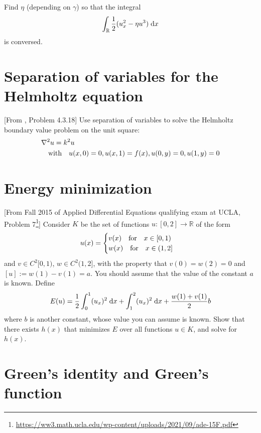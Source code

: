 \documentclass[11pt,letterpaper]{article}
\begin{document}
\subsection{}
Find $\eta$ (depending on $\gamma$) so that the integral
\begin{align}
    \int_\mathbb{R} \frac{1}{2}(u_x^2-\eta u^3)\;\mathrm{d} x
\end{align}
is conversed. 

\section{Separation of variables for the Helmholtz equation}
[From \cite{Olver_14}, Problem 4.3.18] Use separation of variables to solve the Helmholtz boundary value problem on the unit square:
\begin{align}
    &\nabla^2 u = k^2u\\
    &\quad \mbox{with} \quad u(x,0)=0, u(x,1)=f(x), u(0, y) = 0, u(1, y) = 0
\end{align}

\section{Energy minimization}
[From Fall 2015 of Applied Differential Equations qualifying exam at UCLA, Problem 7\footnote{\url{https://ww3.math.ucla.edu/wp-content/uploads/2021/09/ade-15F.pdf}}] 
Consider $K$ be the set of functions $u: [0, 2] \to \mathbb{R}$ of the form 
\begin{align}
    u(x) = \begin{cases}
        v(x)\quad \mbox{for} \quad x\in[0,1)\\
        w(x)\quad \mbox{for} \quad x\in(1,2]
    \end{cases}
\end{align} 
and $v\in C^2[0,1)$, $w\in C^2(1,2]$, with the property that $v(0) = w(2) = 0$ and $[u] := w(1) - v(1) = a$. You should assume that the value of the constant $a$ is known. Define
\begin{align}
    E(u) = \frac{1}{2}\int_0^1 (u_x)^2\;\mathrm{d} x+\int^2_1 (u_x)^2\;\mathrm{d} x+\frac{w(1)+v(1)}{2}b
\end{align}
where $b$ is another constant, whose value you can assume is known. Show that there exists $h(x)$ that minimizes $E$ over all functions $u\in K$, and solve for $h(x)$.

\section{Green's identity and Green's function}
\end{document}
